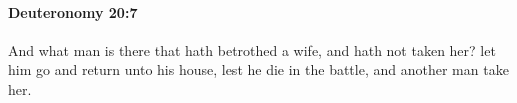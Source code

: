 
		\paragraph{Deuteronomy 20:7} %
			\label{DEUTERONOMY-20-7}

			And what man is there that hath betrothed a wife, and hath not taken her? let him go and return unto his house, lest he die in the battle, and another man take her.



